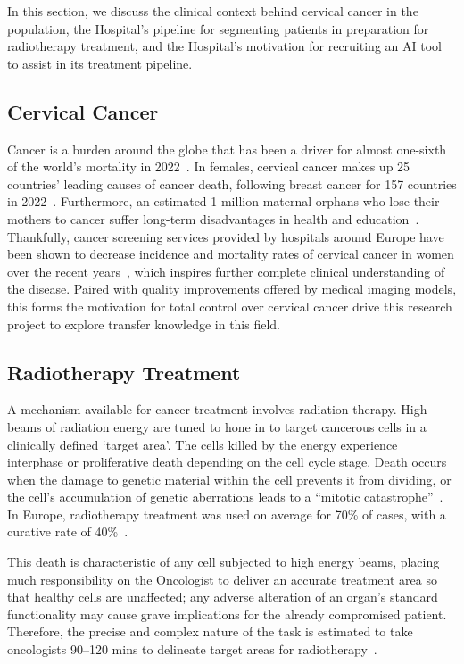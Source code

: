 \documentclass[12pt,twoside]{report}
\begin{document}
In this section, we discuss the clinical context behind cervical cancer in the population, the Hospital's pipeline for segmenting patients in preparation for radiotherapy treatment, and the Hospital's motivation for recruiting an AI tool to assist in its treatment pipeline. 

\subsection{Cervical Cancer}\label{sect:cervical-cancer}

Cancer is a burden around the globe that has been a driver for almost one-sixth of the world's mortality in 2022~\cite{Global-cancer-2022}. In females, cervical cancer makes up 25 countries' leading causes of cancer death, following breast cancer for 157 countries in 2022~\cite{Global-cancer-2022}. Furthermore, an estimated 1 million maternal orphans who lose their mothers to cancer suffer long-term disadvantages in health and education~\cite{Guida2022}. Thankfully, cancer screening services provided by hospitals around Europe have been shown to decrease incidence and mortality rates of cervical cancer in women over the recent years~\cite{Global-cancer-2022}, which inspires further complete clinical understanding of the disease. Paired with quality improvements offered by medical imaging models, this forms the motivation for total control over cervical cancer drive this research project to explore transfer knowledge in this field. %

\subsection{Radiotherapy Treatment}

A mechanism available for cancer treatment involves radiation therapy. High beams of radiation energy are tuned to hone in to target cancerous cells in a clinically defined `target area'. The cells killed by the energy experience interphase or proliferative death depending on the cell cycle stage. Death occurs when the damage to genetic material within the cell prevents it from dividing, or the cell's accumulation of genetic aberrations leads to a ``mitotic catastrophe''~\cite{cell-death}. In Europe, radiotherapy treatment was used on average for 70\% of cases, with a curative rate of 40\%~\cite{radiotherapy-advances, Thompson2018}.

This death is characteristic of any cell subjected to high energy beams, placing much responsibility on the Oncologist to deliver an accurate treatment area so that healthy cells are unaffected; any adverse alteration of an organ's standard functionality may cause grave implications for the already compromised patient. Therefore, the precise and complex nature of the task is estimated to take oncologists 90--120 mins to delineate target areas for radiotherapy~\cite{LIU2020184}.
\end{document}
